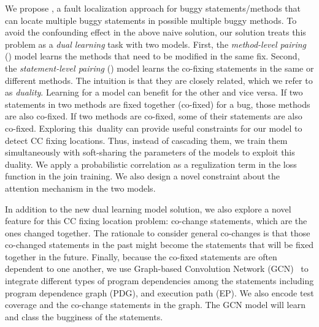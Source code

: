 We propose {\tool}, a fault localization approach for buggy
statements/methods that can locate multiple buggy statements in
possible multiple buggy methods. To avoid the confounding effect in
the above naive solution, our solution treats this problem as a {\em
  dual learning} task with two models. First, the {\em method-level
  pairing} () model learns the methods that need to be
modified in the same fix. Second, the {\em statement-level pairing}
() model learns the co-fixing statements in the same or
different methods. The intuition is that they are closely related,
which we refer to as {\em duality}. Learning for a model can benefit
for the other and vice versa. If two statements in two methods are
fixed together (co-fixed) for a bug, those methods are also
co-fixed. If two methods are co-fixed, some of their statements
are also co-fixed. Exploring this~duality can provide useful
constraints for our model to detect CC fixing locations. Thus,
instead of cascading them, we train them simultaneously with
soft-sharing the parameters of the models to exploit this
duality. We apply a probabilistic correlation as a regulization term
in the loss function in the join training. We also design a novel
constraint about the attention mechanism in the two models.

In addition to the new dual learning model solution, we also explore a
novel feature for this CC fixing location problem: co-change
statements, which are the ones changed together. The rationale to
consider general co-changes is that those co-changed statements in the
past might become the statements that will be fixed together in the
future. Finally, because the co-fixed statements are often dependent
to one another, we use Graph-based Convolution Network
(GCN)~\cite{li2019gcn} to integrate different types of program
dependencies among the statements including program dependence graph
(PDG), and execution path (EP). We also encode test coverage and the
co-change statements in the graph. The GCN model will learn and class
the bugginess of the statements.



